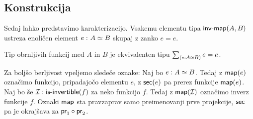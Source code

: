 \subsection{Konstrukcija}

Sedaj lahko predstavimo karakterizacijo. Vsakemu elementu tipa \(\textnormal{\textsf{inv-map}}(A, B)\) ustreza enoličen element \(e \,\colon A \simeq B\) skupaj z zanko \(e = e\).

\begin{izrek}
  \label{main-char}
  Tip obrnljivih funkcij med \(A\) in \(B\) je ekvivalenten tipu \(\textstyle \sum_{\left( e : A \simeq B \right)} e = e\).
\end{izrek}

Za boljšo berljivost vpeljemo sledeče oznake: Naj bo \(e : A \simeq B\). Tedaj z \(\textnormal{\textsf{map}}(e)\) označimo funkcijo, pripadajočo elementu \(e\), z \(\textnormal{\textsf{sec}}(e)\) pa prerez funkcije \(\textnormal{\textsf{map}}(e)\). Naj bo še \(\mathcal{I} : \textnormal{\textsf{is-invertible}}(f)\) za neko funkcijo \(f\). Tedaj z \(\textnormal{\textsf{map}}(\mathcal{I})\) označimo inverz funkcije \(f\). Oznaki \(\textnormal{\textsf{map}}\) sta pravzaprav samo preimenovanji prve projekcije, \(\textnormal{\textsf{sec}}\) pa je okrajšava za \(\textnormal{\textsf{pr}}_{1} \circ \textnormal{\textsf{pr}}_{2}\).

